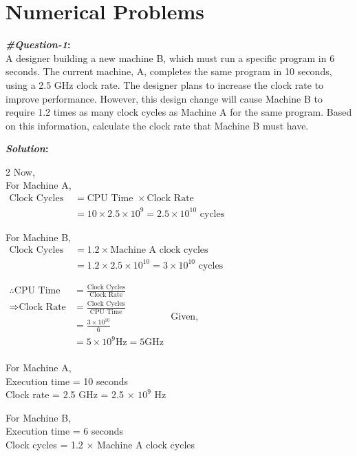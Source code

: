 \pagebreak
\section{Numerical Problems}
\vspace{1em}
\textbf{\textit{\#Question-1}:}\\
A designer building a new machine B, which must run a specific program in 6 seconds. The current machine, A, completes the same program in 10 seconds, using a 2.5 GHz clock rate. The designer plans to increase the clock rate to improve performance. However, this design change will cause Machine B to require 1.2 times as many clock cycles as Machine A for the same program. Based on this information, calculate the clock rate that Machine B must have.

\textbf{\textit{Solution}:}
\begin{multicols}{2}
   \noindent
   \raggedcolumns
   Now,\\
   For Machine A,\\
   $\begin{aligned}
      \text{Clock Cycles } &= \text{CPU Time } \times \text{Clock Rate} \\
      &= \text{10} \times \text{2.5} \times \text{10}^{\text{9}} 
      = \text{2.5} \times \text{10}^{\text{10}} \text{ cycles}
   \end{aligned}$

   For Machine B,\\
   $\begin{aligned}
      \text{Clock Cycles } &= 1.2 \times \text{Machine A clock cycles} \\
      &= \text{1.2} \times \text{2.5} \times \text{10}^{\text{10}} 
      = \text{3} \times \text{10}^{\text{10}} \text{ cycles}
   \end{aligned}$

   $\begin{aligned}
      \therefore \text{CPU Time} &= \frac{\text{Clock Cycles}}{\text{Clock Rate}} \\[0.5em]
     \Rightarrow \text{Clock Rate} &= \frac{\text{Clock Cycles}}{\text{CPU Time}} \\
       &= \frac{\text{3} \times \text{10}^{\text{10}}}{\text{6}} \\
       &= \text{5} \times \text{10}^{\text{9}} \text{Hz}
       = \text{5} \text{GHz} \\
   \end{aligned}$
   \columnbreak
   Given,

   For Machine A,\\
   Execution time = 10 seconds\\
   Clock rate = 2.5 GHz = 2.5 $\times$ $\text{10}^{\text{9}}$ Hz

   For Machine B,\\
   Execution time = 6 seconds\\
   Clock cycles = 1.2 $\times$ Machine A clock cycles
\end{multicols}



